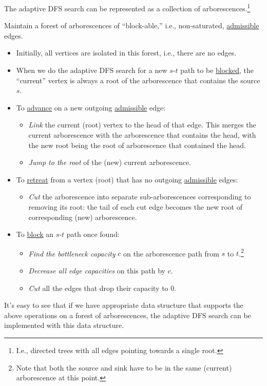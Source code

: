 \begin{claim}\label{clm:adaptive-DFS-link-cut-tree}
	The adaptive DFS search can be represented as a collection of arborescences.\footnote{I.e., directed trees with all edges pointing towards a single root.}
\end{claim}
\begin{explanation}
	Maintain a forest of arborescences of ``block-able,'' i.e., non-saturated, \hyperref[def:admissible]{admissible} edges.
	\begin{itemize}
		\item Initially, all vertices are isolated in this forest, i.e., there are no edges.
		\item When we do the adaptive DFS search for a new \(s\)-\(t\) path to be \hyperref[algo:adaptive-DFS-block]{blocked}, the ``current'' vertex is always a root of the arborescence that contains the source \(s\).
		\item To \hyperref[algo:adaptive-DFS-advance]{advance} on a new outgoing \hyperref[def:admissible]{admissible} edge:
		      \begin{itemize}
			      \item \emph{Link} the current (root) vertex to the head of that edge. This merges the current arborescence with the arborescence that contains the head, with the new root being the root of arborescence that contained the head.
			      \item \emph{Jump to the root} of the (new) current arborescence.
		      \end{itemize}
		\item To \hyperref[algo:adaptive-DFS-retreat]{retreat} from a vertex (root) that has no outgoing \hyperref[def:admissible]{admissible} edges:
		      \begin{itemize}
			      \item \emph{Cut} the arborescence into separate sub-arborescences corresponding to removing its root: the tail of each cut edge becomes the new root of corresponding (new) arborescence.
		      \end{itemize}
		\item To \hyperref[algo:adaptive-DFS-block]{block} an \(s\)-\(t\) path once found:
		      \begin{itemize}
			      \item \emph{Find the bottleneck capacity} \(c\) on the arborescence path from \(s\) to \(t\).\footnote{Note that both the source and sink have to be in the same (current) arborescence at this point.}
			      \item \emph{Decrease all edge capacities} on this path by \(c\).
			      \item \emph{Cut} all the edges that drop their capacity to \(0\).
		      \end{itemize}
	\end{itemize}
	It's easy to see that if we have appropriate data structure that supports the above operations on a forest of arborescences, the adaptive DFS search can be implemented with this data structure.
\end{explanation}

